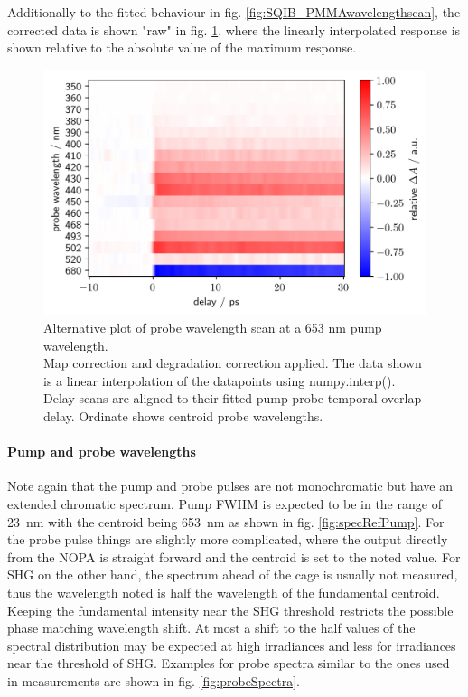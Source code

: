 \documentclass[twoside,openright,listof=numbered]{scrreprt}
\begin{document}
Additionally to the fitted behaviour in fig. \ref{fig:SQIB_PMMAwavelengthscan}, the corrected data is shown "raw" in fig. \ref{fig:SQIB_PMMA_rawWavs}, where the linearly interpolated response is shown relative to the absolute value of the maximum response.
\begin{figure}[htp]
\centering
\includegraphics[scale=1]{images/RawishDataWavelengthScanSHG.png}
\caption[Probe wavelength scan at a 653 nm pump wavelength with linear interpolation of time steps.]{Alternative plot of probe wavelength scan at a 653 nm pump wavelength.\\Map correction and degradation correction applied. The data shown is a linear interpolation of the datapoints using numpy.interp(). Delay scans are aligned to their fitted pump probe temporal overlap delay. Ordinate shows centroid probe wavelengths.\label{fig:SQIB_PMMA_rawWavs}}
\end{figure}
\paragraph{Pump and probe wavelengths}
Note again that the pump and probe pulses are not monochromatic but have an extended chromatic spectrum. Pump FWHM is expected to be in the range of \SI{23}{\nano\meter} with the centroid being \SI{653}{\nano\meter} as shown in fig. \ref{fig:specRefPump}. For the probe pulse things are slightly more complicated, where the output directly from the NOPA is straight forward and the centroid is set to the noted value. For SHG on the other hand, the spectrum ahead of the cage is usually not measured, thus the wavelength noted is half the wavelength of the fundamental centroid. Keeping the fundamental intensity near the SHG threshold restricts the possible phase matching wavelength shift. At most a shift to the half values of the spectral distribution may be expected at high irradiances and less for irradiances near the threshold of SHG. Examples for probe spectra similar to the ones used in measurements are shown in fig. \ref{fig:probeSpectra}.
\end{document}
